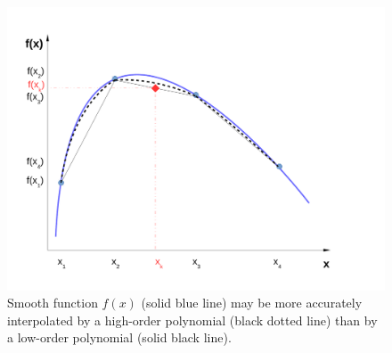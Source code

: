      \begin{figure}[h]\label{Appendix:Fig:Interpolation}%
        \begin{center}
          \includegraphics[width=\columnwidth,clip]{./../Pics/Interpolation}
           \caption{Smooth function $f(x)$ (solid blue line) may be more accurately interpolated by a high-order polynomial (black dotted line) than by a low-order polynomial (solid black line).} 
        \end{center}
      \end{figure}

